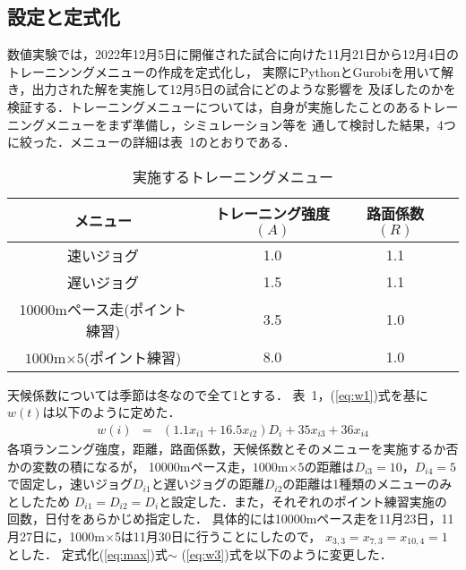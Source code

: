 \documentclass[12pt]{jarticle}
\begin{document}
\subsection{設定と定式化}
数値実験では，2022年12月5日に開催された試合に向けた11月21日から12月4日のトレーニンングメニューの作成を定式化し，
実際にPythonとGurobiを用いて解き，出力された解を実施して12月5日の試合にどのような影響を
及ぼしたのかを検証する．トレーニングメニューについては，自身が実施したことのあるトレーニングメニューをまず準備し，シミュレーション等を
通して検討した結果，4つに絞った．メニューの詳細は表\ 1のとおりである．
\begin{longtable}{|c|c|c|c|}
  \caption{実施するトレーニングメニュー}                                   \\
  \hline
  メニュー                         & トレーニング強度$(A)$ & 路面係数$(R)$ \\
  \hline
  速いジョグ                       & 1.0                   & 1.1           \\
  \hline
  遅いジョグ                       & 1.5                   & 1.1           \\
  \hline
  10000mペース走(ポイント練習)     & 3.5                   & 1.0           \\
  \hline
  $1000$m$ \times 5$(ポイント練習) & 8.0                   & 1.0           \\
  \hline
\end{longtable}
天候係数については季節は冬なので全て1とする．
表\ 1，(\ref{eq:w1})式を基に$w(t)$は以下のように定めた．
\begin{eqnarray}
  w(i)&=&(1.1x_{i1}+16.5x_{i2})D_{i}+35x_{i3}+36x_{i4}\label{eq:w3}
\end{eqnarray}
各項ランニング強度，距離，路面係数，天候係数とそのメニューを実施するか否かの変数の積になるが，
10000mペース走，$1000$m$\times 5$の距離は$D_{i3}=10$，$D_{i4}=5$で固定し，速いジョグ$D_{i1}$と遅いジョグの距離$D_{i2}$の距離は1種類のメニューのみとしたため
$D_{i1}=D_{i2}=D_i$と設定した．また，それぞれのポイント練習実施の回数，日付をあらかじめ指定した．
具体的には10000mペース走を11月23日，11月27日に，1000m$\times$5は11月30日に行うことにしたので，
$x_{3,3}=x_{7,3}=x_{10,4}=1$とした．
定式化(\ref{eq:max})式$\sim$ (\ref{eq:w3})式を以下のように変更した．
\end{document}
